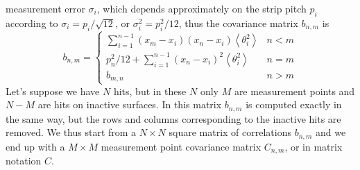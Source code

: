 \documentclass[10pt,a4paper]{article}
\begin{document}
measurement error $\sigma_i$, which depends approximately on the strip
pitch $p_i$ according to $\sigma_i = p_i / \sqrt{12}$, or $\sigma_i^2
= p_i^2 / 12$, thus the covariance matrix $b_{n,m}$ is
\begin{equation}
  b_{n,m}= \left \{
\begin{array}{cl}
  \sum_{i=1}^{n-1} \left (  x_m - x_i \right ) \left (  x_n - x_i \right )  \left < \theta_i^2 \right > & n<m \\
  p_n^2 / 12 + \sum_{i=1}^{n-1} \left (  x_n - x_i \right )^2  \left < \theta_i^2 \right > & n=m \\
  b_{m,n}  & n>m
\end{array}
\right .
\end{equation}
Let's suppose we have $N$ hits, but in these $N$ only $M$ are
measurement points and $N-M$ are hits on inactive surfaces. In this
matrix $b_{n,m}$ is computed exactly in the same way, but the rows and
columns corresponding to the inactive hits are removed. We thus start
from a $N\times N$ square matrix of correlations $b_{n,m}$ and we end
up with a $M\times M$ measurement point covariance matrix $C_{n,m}$,
or in matrix notation $C$.
\end{document}
